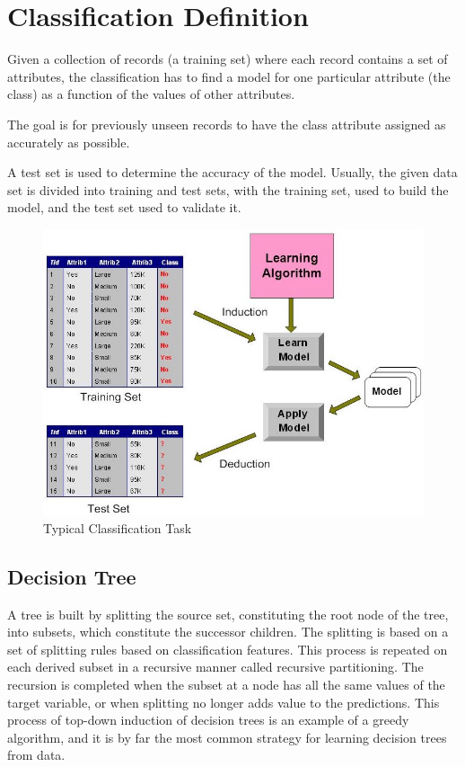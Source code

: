 \section{Classification Definition}
Given a collection of records (a training set) where each record contains a set of attributes, the classification has to find a model for one particular attribute (the class) as a function of the values of other attributes.

The goal is for previously unseen records to have the class attribute assigned as accurately as possible.

A test set is used to determine the accuracy of the model. Usually, the given data set is divided into
training and test sets, with the training set, used to build the model, and the test set used to validate it.

\bigskip
\begin{figure}[H]
    \centering
    \includegraphics[scale=0.5]{figures/classification.jpg}
    \caption{Typical Classification Task}
\end{figure}

\subsection{Decision Tree}

A tree is built by splitting the source set, constituting the root node of the tree, 
into subsets, which constitute the successor children. 
The splitting is based on a set of splitting rules based on classification features. 
This process is repeated on each derived subset in a recursive manner called recursive partitioning. 
The recursion is completed when the subset at a node has all the same values of the target variable, 
or when splitting no longer adds value to the predictions. 
This process of top-down induction of decision trees is an example of a greedy algorithm, 
and it is by far the most common strategy for learning decision trees from data.

